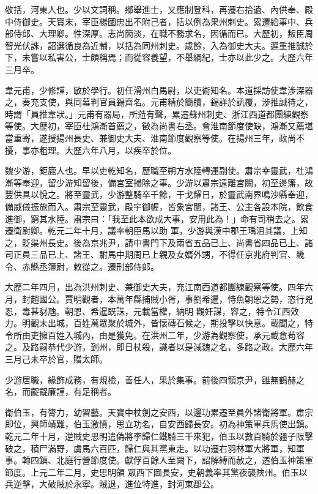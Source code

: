 \begin{pinyinscope}
 敬括，河東人也。少以文詞稱。鄉舉進士，又應制登科，再遷右拾遺、內供奉、殿中侍御史。天寶末，宰臣楊國忠出不附己者，括以例為果州刺史。累遷給事中、兵部侍郎、大理卿。性深厚。志尚簡淡，在職不務求名，因循而已。大歷初，叛臣周智光伏誅，詔選循良為近輔，以括為同州刺史。歲餘，入為御史大夫。遲重推誠於下，未嘗以私害公，士頗稱焉；而從容養望，不舉綱紀，士亦以此少之。大歷六年三月卒。



 韋元甫，少修謹，敏於學行。初任滑州白馬尉，以吏術知名。本道採訪使韋涉深器之，奏充支使，與同幕判官員錫齊名。元甫精於簡牘，錫詳於訊覆，涉推誠待之，時謂「員推韋狀。」元甫有器局，所蒞有聲，累遷蘇州刺史、浙江西道都團練觀察等使。大歷初，宰臣杜鴻漸首薦之，徵為尚書右丞。會淮南節度使缺，鴻漸又薦堪當重寄，遂授揚州長史、兼御史大夫、淮南節度觀察等使。在揚州三年，政尚不擾，事亦粗理。大歷六年八月，以疾卒於位。



 魏少游，鉅鹿人也。早以吏乾知名，歷職至朔方水陸轉運副使。肅宗幸靈武，杜鴻漸等奉迎，留少游知留後，備宮室掃除之事。少游以肅宗遠離宮闕，初至邊籓，故豐供具以悅之。將至靈武，少游整騎卒千餘，干戈耀日，於靈武南界鳴沙縣奉迎，備威儀振旅而入。肅宗至靈武，殿宇御幄，皆象宮闈，諸王、公主各設本院，飲食進御，窮其水陸。肅宗曰：「我至此本欲成大事，安用此為！」命有司稍去之。累遷衛尉卿。乾元二年十月，議率朝臣馬以助
 軍，少游與漢中郡王瑀沮其議，上知之，貶渠州長史。後為京兆尹，請中書門下及兩省五品已上、尚書省四品已上、諸司正員三品已上、諸王、駙馬中期周已上親及女婿外甥，不得任京兆府判官、畿令、赤縣丞簿尉，敕從之。遷刑部侍郎。



 大歷二年四月，出為洪州刺史、兼御史大夫，充江南西道都團練觀察等使。四年六月，封趙國公。賈明觀者，本萬年縣捕賊小胥，事劉希暹，恃魚朝恩之勢，恣行兇忍，毒甚豺虺。朝恩、希暹既誅，元載當權，納明
 觀奸謀，容之，特令江西效力。明觀未出城，百姓萬眾聚於城外，皆懷磚石候之，期投擊以快意。載聞之，特令所由吏擁百姓入城內，由是獲免。在洪州二年，少游為觀察使，承元載意茍容之。及路嗣恭代少游，到州，即日杖殺，識者以是減魏之名，多路之政。大歷六年三月己未卒於官，贈太師。



 少游居職，緣飾成務，有規檢，善任人，果於集事。前後四領京尹，雖無鶴赫之名，而齪齪廉謹，有足稱者。



 衛伯玉，有膂力，幼習藝。天寶中杖劍之安西，以邊功累遷至員外諸衛將軍。肅宗即位，興師靖難，伯玉激憤，思立功名，自安西歸長安。初為神策軍兵馬使出鎮。乾元二年十月，逆賊史思明遣偽將李歸仁鐵騎三千來犯，伯玉以數百騎於疆子阪擊破之，積尸滿野，虜馬六百匹，歸仁與其黨東走。以功遷右羽林軍大將軍，知軍事。轉四鎮、北庭行營節度使。獻俘百餘人至闕下，詔解縛而赦之，遷伯玉神策軍節度。上元二年二月，史思明領
 眾西下圖長安，史朝義率其黨夜襲陜州。伯玉以兵逆擊，大破賊於永寧。賊退，進位特進，封河東郡公。




\end{pinyinscope}

